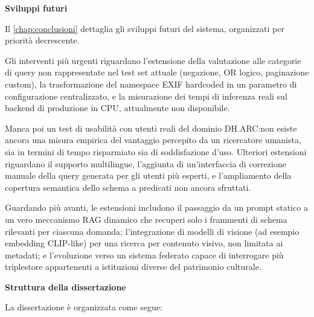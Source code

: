 \textbf{Sviluppi futuri}

Il \cref{chap:conclusioni} dettaglia gli sviluppi futuri del sistema, organizzati per priorità decrescente.

Gli interventi più urgenti riguardano l'estensione della valutazione alle categorie di query non rappresentate nel test set attuale (negazione, OR logico, paginazione custom), la trasformazione del namespace EXIF hardcoded in un parametro di configurazione centralizzato, e la misurazione dei tempi di inferenza reali sul backend di produzione in CPU, attualmente non disponibile.

Manca poi un test di usabilità con utenti reali del dominio DH.ARC:\@ non esiste ancora una misura empirica del vantaggio percepito da un ricercatore umanista, sia in termini di tempo risparmiato sia di soddisfazione d'uso. Ulteriori estensioni riguardano il supporto multilingue, l'aggiunta di un'interfaccia di correzione manuale della query generata per gli utenti più esperti, e l'ampliamento della copertura semantica dello schema a predicati non ancora sfruttati.

Guardando più avanti, le estensioni includono il passaggio da un prompt statico a un vero meccanismo RAG dinamico che recuperi solo i frammenti di schema rilevanti per ciascuna domanda; l'integrazione di modelli di visione (ad esempio embedding CLIP-like) per una ricerca per contenuto visivo, non limitata ai metadati; e l'evoluzione verso un sistema federato capace di interrogare più triplestore appartenenti a istituzioni diverse del patrimonio culturale.


\textbf{Struttura della dissertazione}

La dissertazione è organizzata come segue:

